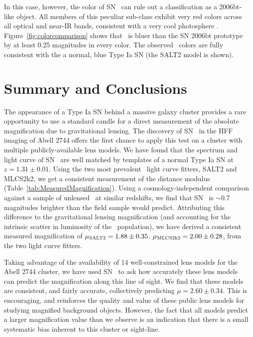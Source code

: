 In this case, however, the color of SN \tomas\ can rule out a
classification as a 2006bt-like object.  All members of this peculiar
sub-class exhibit very red colors across all optical and near-IR
bands, consistent with a very cool photosphere \citep{Foley:2010}.
Figure~\ref{fig:colorcomparison} shows that \tomas\ is bluer than the
SN 2006bt prototype by at least 0.25 magnitudes in every color. The
observed \tomas\ colors are fully consistent with the a normal, blue
Type Ia SN (the SALT2 model is shown).


\section{Summary and Conclusions}
\label{sec:SummaryAndConclusions}

The appearance of a Type Ia SN behind a massive galaxy cluster
provides a rare opportunity to use a standard candle for a direct
measurement of the absolute magnification due to gravitational
lensing.  The discovery of SN \tomas\ in the HFF imaging of Abell 2744
offers the first chance to apply this test on a cluster with multiple
publicly-available lens models.  We have found that the spectrum and
light curve of SN \tomas\ are well matched by templates of a normal
Type Ia SN at $z=1.31\pm0.01$.  Using the two most prevalent \SNIa\
light curve fitters, SALT2 and MLCS2k2, we get a consistent
measurement of the distance modulus
(Table~\ref{tab:MeasuredMagnification}).  Using a
cosmology-independent comparison against a sample of unlensed \SNeIa\
at similar redshifts, we find that SN \tomas\ is $\sim0.7$ magnitudes
brighter than the field sample would predict.  Attributing this
difference to the gravitational lensing magnification (and accounting
for the intrinsic scatter in luminosity of the \SNIa\ population), we
have derived a consistent measured magnification of $\mu_{\rm
SALT2}=1.88\pm0.35$.  $\mu_{\rm MLCS2k2}=2.00\pm0.28$, from the two
light curve fitters.

Taking advantage of the availability of 14 well-constrained lens
models for the Abell 2744 cluster, we have used SN \tomas\ to ask
how accurately these lens models can predict the magnification along
this line of sight.   We find that these models are consistent, and
fairly accurate, collectively predicting $\mu=2.60\pm0.34$.  This is
encouraging, and reinforces the quality and value of these public lens
models for studying magnified background objects.   However, the fact
that all models predict a larger magnification value than we observe
is an indication that there is a small systematic bias inherent to
this cluster or sight-line. 

